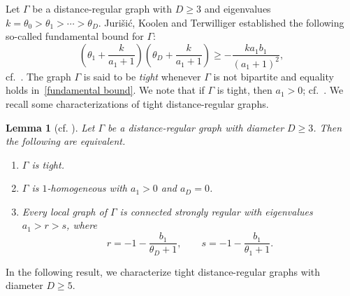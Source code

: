 \documentclass[11pt]{article}
\newtheorem{lemma}[theo]{Lemma}
\theoremstyle{definition}
\numberwithin{equation}{section}
\numberwithin{equation}{section}
\begin{document}
Let $\Gamma$ be a distance-regular graph with $D\geqslant 3$ and eigenvalues $k=\theta_0> \theta_1 > \cdots > \theta_D$.
Juri\v si\'c, Koolen and Terwilliger established the following so-called fundamental bound for $\Gamma$:
\begin{equation}\label{fundamental bound}
	\left( \theta_1 +\frac{k}{a_1 +1} \right)\left( \theta_D +\frac{k}{a_1 +1}\right ) \geqslant -\frac{ka_1b_1}{(a_1 +1)^2},
\end{equation}
cf.~\cite[Theorem 6.2]{JKT2000}.
The graph $\Gamma$ is said to be \emph{tight} whenever $\Gamma$ is not bipartite and equality holds in~\eqref{fundamental bound}.
We note that if $\Gamma$ is tight, then $a_1 > 0$; cf.~\cite[Corollary 6.3]{JKT2000}.
We recall some characterizations of tight distance-regular graphs.
\begin{lemma}[cf. {\cite[Theorem 11.7, Theorem 12.6]{JKT2000}}]\label{char tightDRGs}
Let $\Gamma$ be a distance-regular graph with diameter $D\geqslant 3$. 
Then the following are equivalent.
\begin{enumerate}[\normalfont(i)]
	\setlength\itemsep{0pt}
	\item $\Gamma$ is tight.
	\item $\Gamma$ is $1$-homogeneous with $a_1 > 0$ and $a_D =0$.
	\item Every local graph of $\Gamma$ is connected strongly regular with eigenvalues $a_1>r>s$, where
	$$
		r= -1-\frac{b_1}{\theta_D+1}, \qquad s = -1-\frac{b_1}{\theta_1+1}.
	$$
\end{enumerate}
\end{lemma}

In the following result, we characterize tight distance-regular graphs with diameter $D \geqslant 5$.
\end{document}
